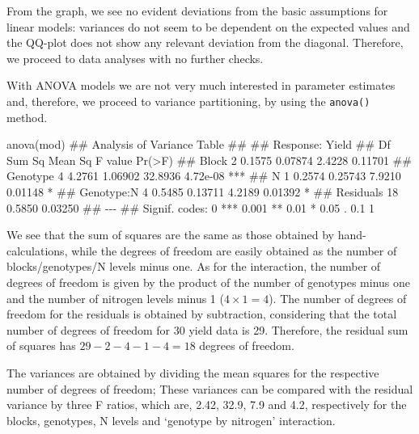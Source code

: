 \documentclass[a4paper,12pt,oneside]{book}
\newenvironment{Shaded}{\begin{snugshade}}{\end{snugshade}}
\newcommand{\DocumentationTok}[1]{#1}
\newcommand{\FunctionTok}[1]{#1}
\newcommand{\NormalTok}[1]{#1}
\begin{document}
From the graph, we see no evident deviations from the basic assumptions for linear models: variances do not seem to be dependent on the expected values and the QQ-plot does not show any relevant deviation from the diagonal. Therefore, we proceed to data analyses with no further checks.

With ANOVA models we are not very much interested in parameter estimates and, therefore, we proceed to variance partitioning, by using the \texttt{anova()} method.

\vspace{12pt}
\footnotesize

\begin{Shaded}
\begin{Highlighting}[]
\FunctionTok{anova}\NormalTok{(mod)}
\DocumentationTok{\#\# Analysis of Variance Table}
\DocumentationTok{\#\# }
\DocumentationTok{\#\# Response: Yield}
\DocumentationTok{\#\#            Df Sum Sq Mean Sq F value   Pr(\textgreater{}F)    }
\DocumentationTok{\#\# Block       2 0.1575 0.07874  2.4228  0.11701    }
\DocumentationTok{\#\# Genotype    4 4.2761 1.06902 32.8936 4.72e{-}08 ***}
\DocumentationTok{\#\# N           1 0.2574 0.25743  7.9210  0.01148 *  }
\DocumentationTok{\#\# Genotype:N  4 0.5485 0.13711  4.2189  0.01392 *  }
\DocumentationTok{\#\# Residuals  18 0.5850 0.03250                     }
\DocumentationTok{\#\# {-}{-}{-}}
\DocumentationTok{\#\# Signif. codes:  0 \textquotesingle{}***\textquotesingle{} 0.001 \textquotesingle{}**\textquotesingle{} 0.01 \textquotesingle{}*\textquotesingle{} 0.05 \textquotesingle{}.\textquotesingle{} 0.1 \textquotesingle{} \textquotesingle{} 1}
\end{Highlighting}
\end{Shaded}

\normalsize

We see that the sum of squares are the same as those obtained by hand-calculations, while the degrees of freedom are easily obtained as the number of blocks/genotypes/N levels minus one. As for the interaction, the number of degrees of freedom is given by the product of the number of genotypes minus one and the number of nitrogen levels minus 1 (\(4 \times 1 = 4\)). The number of degrees of freedom for the residuals is obtained by subtraction, considering that the total number of degrees of freedom for 30 yield data is 29. Therefore, the residual sum of squares has \(29 - 2 - 4 - 1 - 4 = 18\) degrees of freedom.

The variances are obtained by dividing the mean squares for the respective number of degrees of freedom; These variances can be compared with the residual variance by three F ratios, which are, 2.42, 32.9, 7.9 and 4.2, respectively for the blocks, genotypes, N levels and `genotype by nitrogen' interaction.
\end{document}
